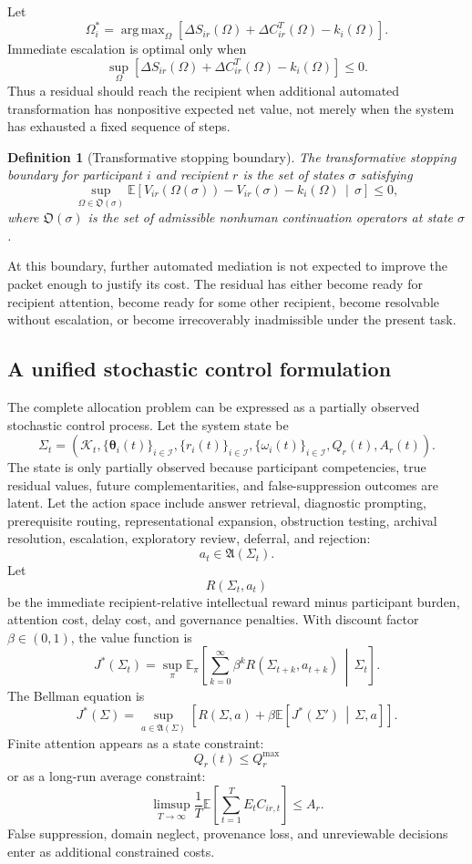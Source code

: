 \documentclass[11pt]{article}
\newtheorem{definition}{Definition}[section]
\theoremstyle{definition}
\DeclareMathOperator{\argmax}{arg\,max}
\newcommand{\E}{\mathbb{E}}
\newcommand{\K}{\mathcal{K}}
\newcommand{\thetaState}{\boldsymbol{\theta}}
\newcommand{\given}{\,\middle|\,}
\begin{document}
Let
\[
\Omega_i^{*}
=
\argmax_{\Omega}
\left[
\Delta S_{ir}(\Omega)
+
\Delta C_{ir}^{T}(\Omega)
-
k_i(\Omega)
\right].
\]
Immediate escalation is optimal only when
\[
\sup_{\Omega}
\left[
\Delta S_{ir}(\Omega)
+
\Delta C_{ir}^{T}(\Omega)
-
k_i(\Omega)
\right]
\leq0.
\]
Thus a residual should reach the recipient when additional automated transformation has nonpositive expected net value, not merely when the system has exhausted a fixed sequence of steps.

\begin{definition}[Transformative stopping boundary]
The transformative stopping boundary for participant \(i\) and recipient \(r\) is the set of states \(\sigma\) satisfying
\[
\sup_{\Omega\in\mathfrak{O}(\sigma)}
\E\!\left[
V_{ir}(\Omega(\sigma))
-
V_{ir}(\sigma)
-
k_i(\Omega)
\given
\sigma
\right]
\leq0,
\]
where \(\mathfrak{O}(\sigma)\) is the set of admissible nonhuman continuation operators at state \(\sigma\).
\end{definition}

At this boundary, further automated mediation is not expected to improve the packet enough to justify its cost. The residual has either become ready for recipient attention, become ready for some other recipient, become resolvable without escalation, or become irrecoverably inadmissible under the present task.

\subsection{A unified stochastic control formulation}

The complete allocation problem can be expressed as a partially observed stochastic control process. Let the system state be
\[
\Sigma_t
=
\left(
\K_t,
\{\thetaState_i(t)\}_{i\in\mathcal{I}},
\{r_i(t)\}_{i\in\mathcal{I}},
\{\omega_i(t)\}_{i\in\mathcal{I}},
Q_r(t),
A_r(t)
\right).
\]
The state is only partially observed because participant competencies, true residual values, future complementarities, and false-suppression outcomes are latent. Let the action space include answer retrieval, diagnostic prompting, prerequisite routing, representational expansion, obstruction testing, archival resolution, escalation, exploratory review, deferral, and rejection:
\[
a_t
\in
\mathfrak{A}(\Sigma_t).
\]
Let
\[
R(\Sigma_t,a_t)
\]
be the immediate recipient-relative intellectual reward minus participant burden, attention cost, delay cost, and governance penalties. With discount factor \(\beta\in(0,1)\), the value function is
\[
J^{*}(\Sigma_t)
=
\sup_{\pi}
\E_{\pi}
\left[
\sum_{k=0}^{\infty}
\beta^k
R(\Sigma_{t+k},a_{t+k})
\given
\Sigma_t
\right].
\]
The Bellman equation is
\[
J^{*}(\Sigma)
=
\sup_{a\in\mathfrak{A}(\Sigma)}
\left[
R(\Sigma,a)
+
\beta
\E\!\left[
J^{*}(\Sigma')
\given
\Sigma,a
\right]
\right].
\]
Finite attention appears as a state constraint:
\[
Q_r(t)\leq Q_r^{\max}
\]
or as a long-run average constraint:
\[
\limsup_{T\to\infty}
\frac{1}{T}
\E\!\left[
\sum_{t=1}^{T}
E_tC_{ir,t}
\right]
\leq
A_r.
\]
False suppression, domain neglect, provenance loss, and unreviewable decisions enter as additional constrained costs.
\end{document}

